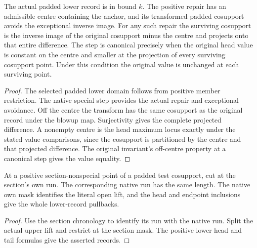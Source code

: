 \begin{theorem}
\label{hir:g1-positive-normal-repair-canonicality-test}
\leanok
The actual padded lower record is in bound $k$. The positive
repair has an admissible centre containing the anchor, and
its transformed padded cosupport avoids the exceptional
inverse image. For any such repair the surviving cosupport
is the inverse image of the original cosupport minus the
centre and projects onto that entire difference. The step
is canonical precisely when the original head value is
constant on the centre and smaller at the projection of
every surviving cosupport point. Under this condition the
original value is unchanged at each surviving point.
\end{theorem}
\begin{proof}
The selected padded lower domain follows from positive
member restriction. The native special step provides the
actual repair and exceptional avoidance. Off the centre the
transform has the same cosupport as the original record
under the blowup map. Surjectivity gives the complete
projected difference. A nonempty centre is the head
maximum locus exactly under the stated value comparisons,
since the cosupport is partitioned by the centre and that
projected difference. The original invariant's off-centre
property at a canonical step gives the value equality.
\end{proof}


\begin{theorem}
\label{hir:g1-positive-normal-own-native-tail}
\leanok
At a positive section-nonspecial point of a padded test cosupport, cut
at the section's own run. The corresponding native run has the same
length. The native own mask identifies the literal open lift, and
the head and endpoint inclusions give the whole lower-record pullbacks.
\end{theorem}
\begin{proof}
Use the section chronology to identify its run with the native run.
Split the actual upper lift and restrict at the section mask. The
positive lower head and tail formulas give the asserted records.
\end{proof}

